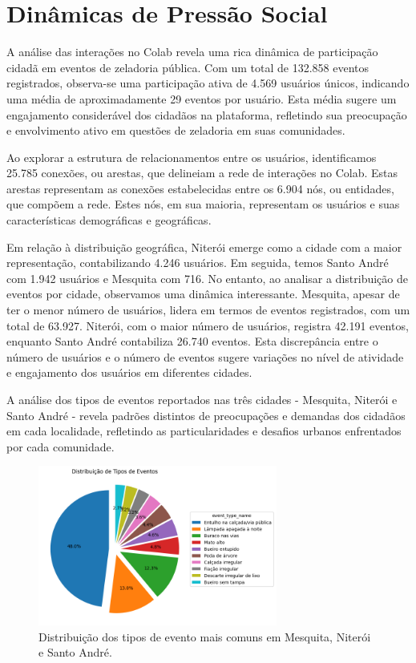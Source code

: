 \section{Dinâmicas de Pressão Social}

A análise das interações no Colab revela uma rica dinâmica de participação cidadã em eventos de zeladoria pública. Com um total de 132.858 eventos registrados, observa-se uma participação ativa de 4.569 usuários únicos, indicando uma média de aproximadamente 29 eventos por usuário. Esta média sugere um engajamento considerável dos cidadãos na plataforma, refletindo sua preocupação e envolvimento ativo em questões de zeladoria em suas comunidades.

Ao explorar a estrutura de relacionamentos entre os usuários, identificamos 25.785 conexões, ou arestas, que delineiam a rede de interações no Colab. Estas arestas representam as conexões estabelecidas entre os 6.904 nós, ou entidades, que compõem a rede. Estes nós, em sua maioria, representam os usuários e suas características demográficas e geográficas.

Em relação à distribuição geográfica, Niterói emerge como a cidade com a maior representação, contabilizando 4.246 usuários. Em seguida, temos Santo André com 1.942 usuários e Mesquita com 716. No entanto, ao analisar a distribuição de eventos por cidade, observamos uma dinâmica interessante. Mesquita, apesar de ter o menor número de usuários, lidera em termos de eventos registrados, com um total de 63.927. Niterói, com o maior número de usuários, registra 42.191 eventos, enquanto Santo André contabiliza 26.740 eventos. Esta discrepância entre o número de usuários e o número de eventos sugere variações no nível de atividade e engajamento dos usuários em diferentes cidades.

A análise dos tipos de eventos reportados nas três cidades - Mesquita, Niterói e Santo André - revela padrões distintos de preocupações e demandas dos cidadãos em cada localidade, refletindo as particularidades e desafios urbanos enfrentados por cada comunidade.

\begin{figure}[htb]
	\centering
	\includegraphics[width=0.7\textwidth]{images/pie_event_distribution.png}
	\caption{Distribuição dos tipos de evento mais comuns em Mesquita, Niterói e Santo André.}
	\label{fig:pie_event_distribution}
\end{figure}

